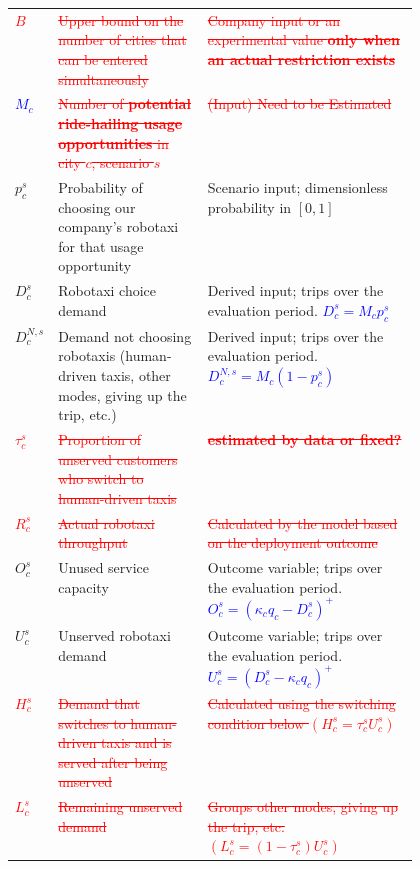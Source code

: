 \documentclass[10pt,a4paper]{article}
\begin{document}
{\begin{tabularx}{\linewidth}{@{}>{\raggedright\arraybackslash}p{0.1\linewidth}>{\raggedright\arraybackslash}p{0.37\linewidth}Y@{}}
\textcolor{red}{\sout{$B$}}
& \textcolor{red}{\sout{Upper bound on the number of cities
that can be entered simultaneously}}
& \textcolor{red}{\sout{Company input or an experimental value
\textbf{only when an actual restriction exists}}} \\
\textcolor{red}{\sout{\textcolor{blue}{$M_c$}}} & \textcolor{red}{\sout{Number of \textbf{potential ride-hailing usage opportunities} in city $c$, scenario $s$}} & \textcolor{red}{\sout{(Input) Need to be Estimated}} \\
$p_c^s$ & Probability of choosing our company's robotaxi for that usage opportunity & Scenario input; dimensionless probability in $[0,1]$ \\
$D_c^s$ & Robotaxi choice demand & Derived input; trips over the evaluation period. \newline \textcolor{blue}{$D_c^s= M_cp_c^s$} \\
$D_c^{N,s}$ & Demand not choosing robotaxis (human-driven taxis, other modes, giving up the trip, etc.) & Derived input; trips over the evaluation period. \newline \textcolor{blue}{$D_c^{N,s}= M_c(1-p_c^s)$} \\
\textcolor{red}{\sout{$\tau_c^s$}}
& \textcolor{red}{\sout{Proportion of unserved customers
who switch to human-driven taxis}}
& \textcolor{red}{\sout{\textbf{estimated by data or fixed?}}} \\
\textcolor{red}{\sout{$R_c^s$}}
& \textcolor{red}{\sout{Actual robotaxi throughput}}
& \textcolor{red}{\sout{Calculated by the model based on
the deployment outcome}} \\

$O_c^s$ & Unused service capacity
& Outcome variable; trips over the evaluation period. \newline \textcolor{blue}{$O_c^s =(\kappa_c q_c-D_c^s)^+$} \\

$U_c^s$ & Unserved robotaxi demand
& Outcome variable; trips over the evaluation period. \newline \textcolor{blue}{$U_c^s=(D_c^s-\kappa_c q_c)^+$} \\

\textcolor{red}{\sout{$H_c^s$}}
& \textcolor{red}{\sout{Demand that switches to human-driven
taxis and is served after being unserved}}
& \textcolor{red}{\sout{Calculated using the switching
condition below $(H_c^s=\tau_c^s U_c^s)$}} \\

\textcolor{red}{\sout{$L_c^s$}}
& \textcolor{red}{\sout{Remaining unserved demand}}
& \textcolor{red}{\sout{Groups other modes, giving up the
trip, etc. $(L_c^s=(1-\tau_c^s)U_c^s)$}} \\
\bottomrule
\end{tabularx}
}
\end{document}
